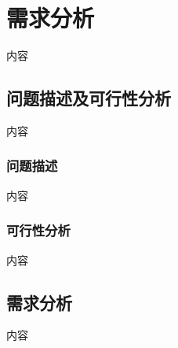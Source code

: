 \chapter{需求分析}
内容

\section{问题描述及可行性分析}
内容

\subsection{问题描述}
内容

\subsection{可行性分析}
内容

\section{需求分析}
内容
